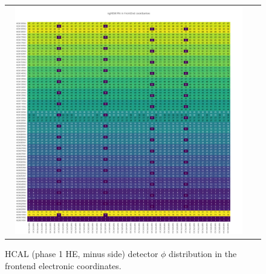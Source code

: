 \clearpage
\begin{figure}[htb]
 \begin{center}
  \begin{tabular}{cc}
   \includegraphics[angle=0,width=0.95\textwidth]{figures/appendix/ngHEM_Phi_in_FrontEnd.png}
  \end{tabular}
  \caption{HCAL (phase 1 HE, minus side) detector $\phi$ distribution in the frontend electronic coordinates.}
  \label{fig:lmapngHEMPhiFEC}
 \end{center}
\end{figure}

